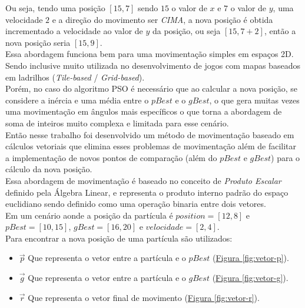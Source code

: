Ou seja, tendo uma posição $[15, 7]$ sendo $15$ o valor de $x$ e $7$ o valor de $y$,
uma velocidade $2$ e a direção do movimento ser \textit{CIMA}, a nova posição é obtida incrementado a velocidade ao valor de $y$ da posição, ou seja $[15, 7+2]$, então a nova posição seria $[15, 9]$.\\
%
Essa abordagem funciona bem para uma movimentação simples em espaços 2D. Sendo inclusive muito utilizada no desenvolvimento de jogos com mapas baseados em ladrilhos (\textit{Tile-based} / \textit{Grid-based}).\\
\indent Porém, no caso do algoritmo PSO é necessário que ao calcular a nova posição, se considere a inércia e uma média entre o $pBest$ e o $gBest$, o que gera muitas vezes uma movimentação em ângulos mais específicos o que torna a abordagem de soma de inteiros muito complexa e limitada para esse cenário.\\
\indent Então nesse trabalho foi desenvolvido um método de movimentação baseado em cálculos vetoriais que elimina esses problemas de movimentação além de facilitar a implementação de novos pontos de comparação (além do $pBest$ e $gBest$) para o cálculo da nova posição.\\
\indent Essa abordagem de movimentação é baseado no conceito de \textit{Produto Escalar} definido pela Álgebra Linear, e representa o produto interno padrão do espaço euclidiano sendo definido como uma operação binaria entre dois vetores.\\
\noindent Em um cenário aonde a posição da partícula é $position=[12,8]$ e $pBest=[10, 15]$, $gBest=[16,20]$ e $velocidade=[2,4]$.\\
\noindent Para encontrar a nova posição de uma partícula são utilizados:
\begin{itemize}
\item $\vec p$ Que representa o vetor entre a partícula e o $pBest$ 
(\hyperref[fig:vetor-p]{Figura \ref{fig:vetor-p}}).
\item $\vec g$ Que representa o vetor entre a partícula e o $gBest$ 
(\hyperref[fig:vetor-g]{Figura \ref{fig:vetor-g}}).
\item $\vec r$ Que representa o vetor final de movimento
(\hyperref[fig:vetor-r]{Figura \ref{fig:vetor-r}}).
\end{itemize}

